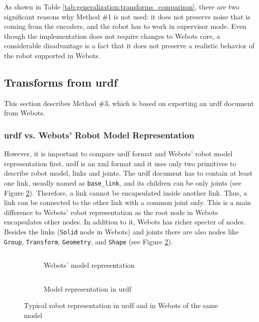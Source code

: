 As shown in Table \ref{tab:generalization:transforms_comparison}, there are two significant reasons why Method \#1 is not used: it does not preserve noise that is coming from the encoders, and the robot has to work in supervisor mode.
Even though the implementation does not require changes to Webots core, a considerable disadvantage is a fact that it does not preserve a realistic behavior of the robot supported in Webots.

\subsection{Transforms from \acs{urdf}}
This section describes Method \#3, which is based on exporting an \ac{urdf} document from Webots. 

\subsubsection{\acs{urdf} vs. Webots' Robot Model Representation}
However, it is important to compare \ac{urdf} format and Webots' robot model representation first.
\ac{urdf} is an \ac{xml} format and it uses only two primitives to describe robot model, links and joints.
The \acs{urdf} document has to contain at least one link, usually named as \texttt{base\_link}, and its children can be only joints \cite{noauthor_urdf_nodate} (see Figure \ref{fig:generalization:urdf_vs_webots:urdf}).
Therefore, a link cannot be encapsulated inside another link. Thus, a link can be connected to the other link with a common joint only.
This is a main difference to Webots' robot representation as the root node in Webots encapsulates other nodes.
In addition to it, Webots has richer specter of nodes.
Besides the links (\texttt{Solid} node in Webots) and joints there are also nodes like \texttt{Group}, \texttt{Transform}, \texttt{Geometry}, and \texttt{Shape} (see Figure \ref{fig:generalization:urdf_vs_webots:urdf}).

\begin{figure}[H]
\centering
\begin{subfigure}{.5\textwidth}
  \centering
  \inputminted{c}{generalization/data/simple.proto}
  \caption{Webots' model representation}
  \label{fig:generalization:urdf_vs_webots:webots}
\end{subfigure}%
\begin{subfigure}{.5\textwidth}
  \centering
  \inputminted[fontsize=\footnotesize]{xml}{generalization/data/simple.urdf}
  \caption{Model representation in \ac{urdf}}
  \label{fig:generalization:urdf_vs_webots:urdf}
\end{subfigure}
\caption{Typical robot representation in \ac{urdf} and in Webots of the same model}
\label{fig:generalization:urdf_vs_webots}
\end{figure}

